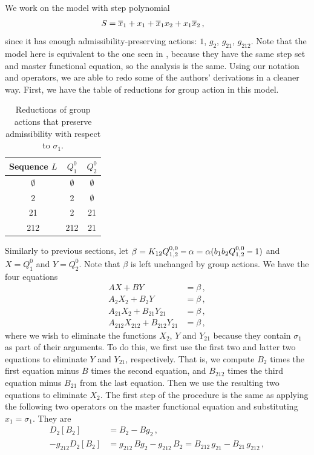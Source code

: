 We work on the model with step polynomial
\begin{align}
	S &= \overline{x}_1 + x_1 + \overline{x}_1x_2 + x_1\overline{x}_2\,,
\end{align}
since it has enough admissibility-preserving actions: $1$, $g_2$, $g_{21}$, $g_{212}$. Note that the model here is equivalent to the one seen in \cite{tabbara2014exact}, because they have the same step set and master functional equation, so the analysis is the same. Using our notation and operators, we are able to redo some of the authors' derivations in a cleaner way. First, we have the table of reductions for group action in this model.
\begin{table}[H]
	\caption{Reductions of group actions that preserve admissibility with respect to $\sigma_1$.}
	\centering
	\begin{tabular}{ccc}
		\toprule
		Sequence $L$ & $Q_1^0$ & $Q_2^0$ \\ 
		\midrule
		$\emptyset$ & $\emptyset$ & $\emptyset$ \\
		2 &  2& $\emptyset$ \\
		21 &  2 & 21   \\
		212 &  212 & 21  \\
		\bottomrule
	\end{tabular}
\end{table}
Similarly to previous sections, let $\beta = K_{12}Q_{1,2}^{0,0} - \alpha = \alpha(b_1b_2Q_{1,2}^{0,0}-1)$ and $X = Q_1^0$ and $Y = Q_2^0$. Note that $\beta$ is left unchanged by group actions. We have the four equations
\begin{align}
	AX + BY&= \beta\,, \\
	A_2 X_2 + B_2 Y &=\beta\,,\\
	A_{21}X_2 + B_{21}Y_{21} &= \beta\,, \\
	A_{212} X_{212} + B_{212} Y_{21}&= \beta\,,
\end{align}
where we wish to eliminate the functions $X_2$, $Y$ and $Y_{21}$ because they contain $\sigma_1$ as part of their arguments. To do this, we first use the first two and latter two equations to eliminate $Y$ and $Y_{21}$, respectively. That is, we compute $B_2$ times the first equation minus $B$ times the second equation, and $B_{212}$ times the third equation minus $B_{21}$ from the last equation. Then we use the resulting two equations to eliminate $X_2$. The first step of the procedure is the same as applying the following two operators on the master functional equation and substituting $x_1 = \sigma_1$. They are
\begin{align}
	D_2[B_2] &= B_2 - B g_2\,,\\
	- g_{212}D_2[B_2] &= g_{212}\,B g_2 - g_{212}\,B_2 =  B_{212} \,g_{21} - B_{21}\,  g_{212}\,, 
\end{align}
